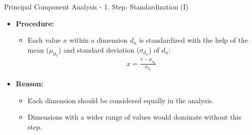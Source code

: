 \begin{frame}{Principal Component Analysis - 1. Step: Standardization (I)}
	\begin{itemize}
		\item \textbf{Procedure:}
		      \begin{itemize}
			      \item Each value $x$ within a dimension $d_n$ is standardized with
			            the help of the mean ($\mu_{d_n}$) and standard deviation
			            ($\sigma_{d_n}$) of $d_n$:
			            \begin{align}
				            x = \frac{x - \mu_{d_n}}{\sigma_{d_n}}
			            \end{align}
		      \end{itemize}
		\item \textbf{Reason:}
		      \begin{itemize}
			      \item Each dimension should be considered equally in the analysis.
			      \item Dimensions with a wider range of	values would dominate
			            without this step.
		      \end{itemize}
	\end{itemize}
\end{frame}


